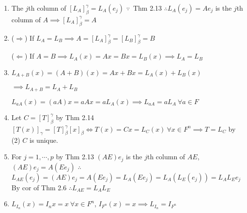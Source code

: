\begin{enumerate}
\item The $j$th column of $[L_A]_{\beta}^{\gamma} = L_A(e_j) $ $\because $\ Thm 2.13 %
	$\therefore L_A(e_j) = Ae_j$ is the $j$th column of $A \implies [L_A]_{\beta}^{\gamma} = A$
\item ($\Rightarrow$) If $L_A = L_B \implies A = [L_A]_{\beta}^{\gamma} = [L_B]_{\beta}^{\gamma} = B$ 
	
	($\Leftarrow$) If $A = B \implies L_A(x) = Ax = Bx = L_{B}(x)\implies L_{A} = L_{B}$	
\item $L_{A+B}(x) = (A + B)(x) = Ax + Bx  = L_A(x) + L_B(x)$ 

	$\implies L_{A+B} = L_A + L_B$
	
	$L_{aA}(x) = (aA)x = aAx = aL_{A}(x)\implies L_{aA} = aL_{A}\ \forall a \in F$
	

\item Let $C = [T]_{\beta}^{\gamma}$ by Thm 2.14 $[T(x)]_{\gamma} = [T]_{\beta}^{\gamma}[x]_{\beta} \Leftrightarrow T(x) = Cx = L_{C}(x)\ \forall x \in F^{n} \implies T = L_{C}$ by (2) $C$ is unique.
\item For $j = 1,\cdots ,p$ by Thm 2.13 $(AE)e_j$ is the  $j$th column of $AE$, $(AE)e_j = A(Ee_j)$ $\therefore$ $L_{AE}(e_j) = (AE)e_j = A(Ee_j) = L_A(Ee_j) = L_A(L_E(e_j)) = L_AL_Ee_j$ By cor of Thm 2.6 $\therefore L_{AE} = L_AL_E$
\item $L_{I_n}(x) = I_nx = x\ \forall x\in F^{n}$, $I_{F^{n}}(x) = x \implies L_{I_n} = I_{F^n}$ 



\end{enumerate} 